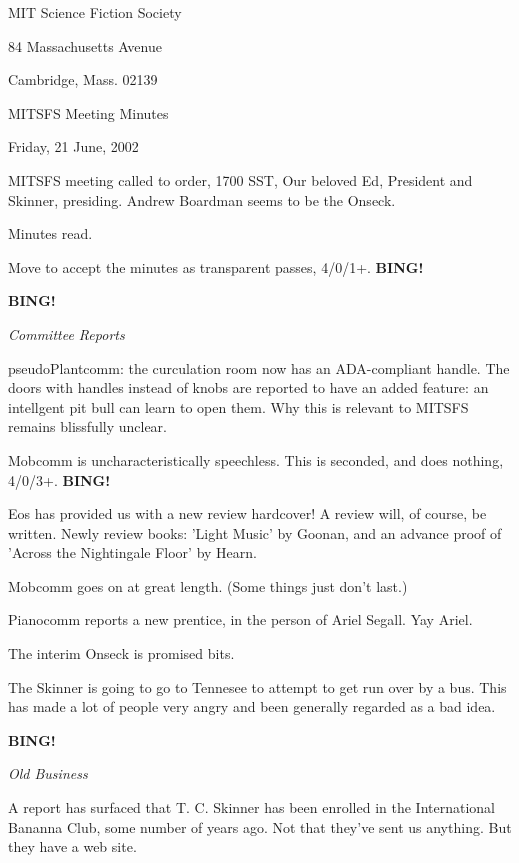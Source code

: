 \documentclass[12pt]{article}
\newcommand{\bing}{{\bf BING!} }
\newcommand{\goto}[1]{\bing \vskip 12pt \centerline{{\em{#1}}}}
\begin{document}
\begin{center}

MIT Science Fiction Society 

84 Massachusetts Avenue

Cambridge, Mass.  02139

\vspace{12pt}

MITSFS Meeting Minutes 

Friday, 21 June, 2002

\end{center}
 
\vspace{18pt}

\setlength{\parskip}{6pt}

\noindent
MITSFS meeting called to order, 1700 SST, Our beloved Ed, President and
Skinner, presiding.  Andrew Boardman seems to be the Onseck.

Minutes read.

Move to accept the minutes as transparent passes, 4/0/1+. \bing

\goto{Committee Reports}

pseudoPlantcomm: the curculation room now has an ADA-compliant handle.
The doors with handles instead of knobs are reported to have an added
feature: an intellgent pit bull can learn to open them.  Why this is
relevant to MITSFS remains blissfully unclear.

Mobcomm is uncharacteristically speechless.  This is seconded, and does
nothing, 4/0/3+. \bing

Eos has provided us with a new review hardcover!  A review will, of
course, be written.  Newly review books: 'Light Music' by Goonan, and an
advance proof of 'Across the Nightingale Floor' by Hearn.

Mobcomm goes on at great length.  (Some things just don't last.)

Pianocomm reports a new prentice, in the person of Ariel Segall.  Yay Ariel.

The interim Onseck is promised bits.

The Skinner is going to go to Tennesee to attempt to get run over by a
bus.  This has made a lot of people very angry and been generally
regarded as a bad idea.

\goto{Old Business}

A report has surfaced that T. C. Skinner has been enrolled in the
International Bananna Club, some number of years ago.  Not that they've
sent us anything.  But they have a web site.
\end{document}
